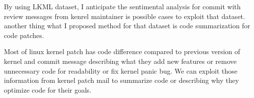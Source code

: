 By using LKML dataset, I anticipate the
sentimental analysis for commit with review messages from kenrel maintainer is
possible cases to exploit that dataset. another thing what I proposed method for
that dataset is code summarization for code patches.

Most of linux kernel patch
has code difference compared to previous version of kernel and commit message
describing what they add new features or remove unnecessary code for readability
or fix kernel panic bug. We can exploit those information from kernel patch mail
to summarize code or describing why they optimize code for their goals.
